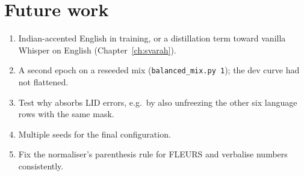 \section{Future work}

\begin{enumerate}
\item Indian-accented English in training, or a distillation term toward vanilla Whisper on English (Chapter~\ref{ch:svarah}).
\item A second epoch on a reseeded mix (\texttt{balanced\_mix.py 1}); the dev curve had not flattened.
\item Test why  absorbs LID errors, e.g.\ by also unfreezing the other six language rows with the same mask.
\item Multiple seeds for the final configuration.
\item Fix the normaliser's parenthesis rule for FLEURS and verbalise numbers consistently.
\end{enumerate}
